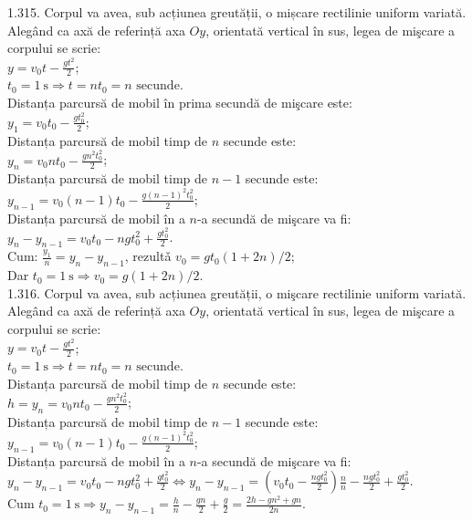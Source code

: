 1.315. Corpul va avea, sub acțiunea greutății, o mișcare rectilinie uniform variată. Alegând ca axă de referință axa $Oy$, orientată vertical în sus, legea de mişcare a corpului se scrie:\\ $y=v_{0} t-\frac{g t^{2}}{2}$;\\ $t_{0}=1 \mathrm{~s} \Rightarrow t=n t_{0}=n \text {~secunde}$.\\ Distanța parcursă de mobil în prima secundă de mişcare este:\\ $y_{1}=v_{0} t_{0}-\frac{g t_{0}^{2}}{2}$;\\ Distanța parcursă de mobil timp de $n$ secunde este:\\ $y_{n}=v_{0} n t_{0}-\frac{g n^{2} t_{0}^{2}}{2}$;\\ Distanța parcursă de mobil timp de $n-1$ secunde este:\\ $y_{n-1}=v_{0}(n-1) t_{0}-\frac{g(n-1)^{2} t_{0}^{2}}{2}$;\\ Distanța parcursă de mobil în a $n$-a secundă de mişcare va fi:\\ $y_{n}-y_{n-1}=v_{0} t_{0}-n g t_{0}^{2}+\frac{g t_{0}^{2}}{2}$.\\ Cum: $\frac{y_{1}}{n}=y_{n}-y_{n-1}$, rezultǎ $v_{0}=g t_{0}(1+2 n) / 2$;\\ Dar $t_{0}=1 \mathrm{~s} \Rightarrow v_{0}=g(1+2 n) / 2$.\\

1.316. Corpul va avea, sub acțiunea greutății, o mişcare rectilinie uniform variată. Alegând ca axă de referință axa $Oy$, orientată vertical în sus, legea de mişcare a corpului se scrie:\\ $y=v_{0} t-\frac{g t^{2}}{2}$;\\ $t_{0}=1 \mathrm{~s} \Rightarrow t=n t_{0}=n \text {~secunde}$.\\ Distanța parcursă de mobil timp de $n$ secunde este:\\ $h=y_{n}=v_{0} n t_{0}-\frac{g n^{2} t_{0}^{2}}{2}$;\\ Distanța parcursă de mobil timp de $n-1$ secunde este:\\ $y_{n-1}=v_{0}(n-1) t_{0}-\frac{g(n-1)^{2} t_{0}^{2}}{2}$;\\ Distanța parcursă de mobil în a $n$-a secundă de mişcare va fi:\\ $y_{n}-y_{n-1}=v_{0} t_{0}-n g t_{0}^{2}+\frac{g t_{0}^{2}}{2} \Leftrightarrow y_{n}-y_{n-1}=\left(v_{0} t_{0}-\frac{n g t_{0}^{2}}{2}\right) \frac{n}{n}-\frac{n g t_{0}^{2}}{2}+\frac{g t_{0}^{2}}{2}$.\\ Cum $t_{0}=1 \mathrm{~s} \Rightarrow y_{n}-y_{n-1}=\frac{h}{n}-\frac{g n}{2}+\frac{g}{2}=\frac{2 h-g n^{2}+g n}{2 n}$.\\

